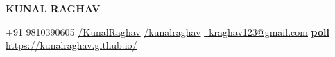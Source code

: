 \documentclass[10pt,a4paper]{extarticle}
\begin{document}
\noindent
	\begin{center}
	\begin{LARGE}
		{
		\color{resumeBlueLight}
			\bfseries{ KUNAL RAGHAV} 
		}\\					
	\end{LARGE}

		\begin{center}
		{ +91 9810390605}   \hspace{2mm}
		\href{https://github.com/KunalRaghav}{/KunalRaghav}  \hspace{1mm}
		\href{https://www.linkedin.com/in/kunalraghav/}{/kunalraghav}   \hspace{1mm}
		\href{mailto:kraghav123@gmail.com}{ \ kraghav123@gmail.com} \hspace{1mm}
		\href{https://kunalraghav.github.io/}{{\textbf{\color{resumeBlueLight}\fontAwesome poll}}  https://kunalraghav.github.io/} 
		\end{center}

		
	\end{center}
	\hfill
\end{document}

